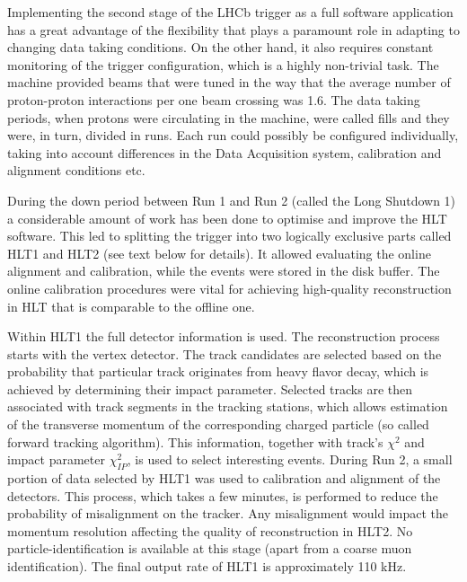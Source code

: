 Implementing the second stage of the LHCb trigger as a full software application has
a great advantage of the flexibility that plays a paramount role in adapting to changing
data taking conditions. On the other hand, it also requires constant monitoring of the
trigger configuration, which is a highly non-trivial task. The machine provided beams
that were tuned in the way that the average number of proton-proton interactions per
one beam crossing was 1.6. The data taking periods, when protons were circulating
in the machine, were called fills and they were, in turn, divided in runs. Each run
could possibly be configured individually, taking into account differences in the Data
Acquisition system, calibration and alignment conditions etc. 


During the down period between Run 1 and Run 2 (called the Long Shutdown 1) a considerable amount of work has been done to optimise and improve the HLT software. This led to splitting the trigger into two logically exclusive parts called HLT1 and HLT2 (see text below for details). It allowed evaluating the online alignment and calibration, while the events were stored in the disk buffer.
The online calibration procedures were vital for achieving high-quality reconstruction in HLT that is comparable to the offline one.

Within HLT1 the full detector information is used. The reconstruction process starts with the vertex detector. The track candidates are selected based on the probability that particular track originates from heavy flavor decay, which is achieved by determining their impact parameter. Selected tracks are then associated with track segments in the tracking stations, which allows estimation of the transverse momentum of the corresponding charged particle (so called forward tracking algorithm). This information, together with track's $\chi^2$ and impact parameter $\chi^2_{IP}$, is used to select interesting events.  
During Run 2, a small portion of data selected by HLT1 was used to calibration and alignment of the detectors. This process, which takes a few minutes, is performed to reduce the probability of misalignment on the tracker. Any misalignment would impact the momentum resolution affecting the quality of reconstruction in HLT2. No particle-identification is available at this stage (apart from a coarse muon identification). The final output rate of HLT1 is approximately 110 kHz.

